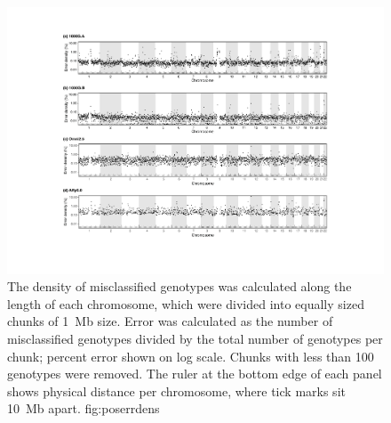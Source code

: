 

\begin{figure}[tbp]
\includegraphics[width=\textwidth]{./img/ch4/poserrdens_new}
%
{The density of misclassified genotypes was calculated along the length of each chromosome, which were divided into equally sized chunks of 1~Mb size.
Error was calculated as the number of misclassified genotypes divided by the total number of genotypes per chunk; percent error shown on log scale.
Chunks with less than 100 genotypes were removed.
The ruler at the bottom edge of each panel shows physical distance per chromosome, where tick marks sit 10~Mb apart.\CorrectLabel}%
{fig:poserrdens}
\end{figure}
